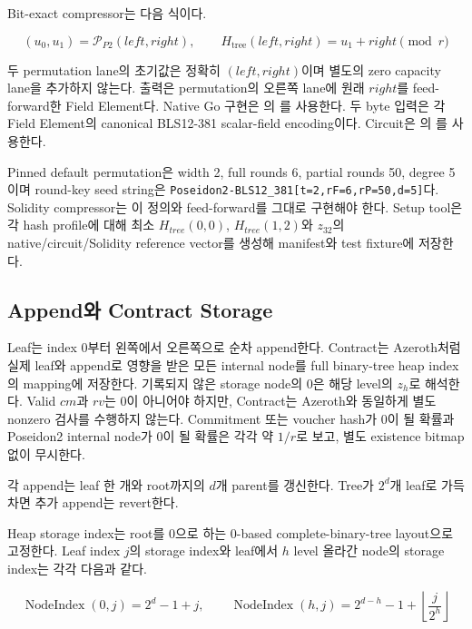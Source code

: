 \documentclass[11pt,a4paper]{extarticle}
\begin{document}
Bit-exact compressor는 다음 식이다.

\[
(u_0,u_1)=\mathcal{P}_{P2}(left,right),
\qquad
H_{\mathrm{tree}}(left,right)=u_1+right\pmod r
\]

두 permutation lane의 초기값은 정확히 $(left,right)$이며 별도의 zero capacity lane을
추가하지 않는다. 출력은 permutation의 오른쪽 lane에 원래 $right$를 feed-forward한
Field Element다. Native Go 구현은
의
를 사용한다. 두 byte 입력은
각 Field Element의 canonical BLS12-381 scalar-field encoding이다. Circuit은
의
를 사용한다.

Pinned default permutation은 width 2, full rounds 6, partial rounds 50, degree 5이며
round-key seed string은
\texttt{Poseidon2-BLS12\_381[t=2,rF=6,rP=50,d=5]}다. Solidity compressor는 이
정의와 feed-forward를 그대로 구현해야 한다. Setup tool은 각 hash profile에 대해 최소
$H_{tree}(0,0)$, $H_{tree}(1,2)$와 $z_{32}$의 native/circuit/Solidity reference vector를 생성해
manifest와 test fixture에 저장한다.

\subsection{Append와 Contract Storage}

Leaf는 index 0부터 왼쪽에서 오른쪽으로 순차 append한다. Contract는 Azeroth처럼
실제 leaf와 append로 영향을 받은 모든 internal node를 full binary-tree heap index의
mapping에 저장한다. 기록되지 않은 storage node의 0은 해당 level의 $z_h$로 해석한다.
Valid $cm$과 $rv$는 0이 아니어야 하지만, Contract는 Azeroth와 동일하게 별도
nonzero 검사를 수행하지 않는다. Commitment 또는 voucher hash가 0이 될 확률과
Poseidon2 internal node가 0이 될 확률은 각각 약 $1/r$로 보고, 별도 existence
bitmap 없이 무시한다.

각 append는 leaf 한 개와 root까지의 $d$개 parent를 갱신한다. Tree가 $2^d$개 leaf로
가득 차면 추가 append는 revert한다.

Heap storage index는 root를 0으로 하는 0-based complete-binary-tree layout으로 고정한다.
Leaf index $j$의 storage index와 leaf에서 $h$ level 올라간 node의 storage index는 각각
다음과 같다.

\[
\operatorname{NodeIndex}(0,j)=2^d-1+j,
\qquad
\operatorname{NodeIndex}(h,j)=2^{d-h}-1+\left\lfloor\frac{j}{2^h}\right\rfloor
\]
\end{document}
